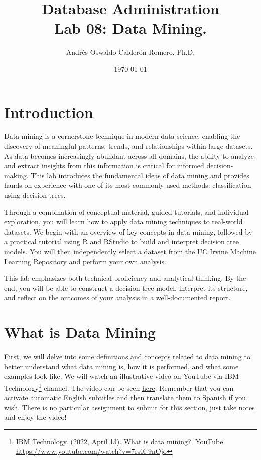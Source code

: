 \documentclass{article}
\title{Database Administration \\ Lab 08: Data Mining.}
\author{Andrés Oswaldo Calderón Romero, Ph.D.}
\date{\today}
\begin{document}
\maketitle

\section{Introduction}

Data mining is a cornerstone technique in modern data science, enabling the discovery of meaningful patterns, trends, and relationships within large datasets. As data becomes increasingly abundant across all domains, the ability to analyze and extract insights from this information is critical for informed decision-making. This lab introduces the fundamental ideas of data mining and provides hands-on experience with one of its most commonly used methods: classification using decision trees.

Through a combination of conceptual material, guided tutorials, and individual exploration, you will learn how to apply data mining techniques to real-world datasets. We begin with an overview of key concepts in data mining, followed by a practical tutorial using R and RStudio to build and interpret decision tree models. You will then independently select a dataset from the UC Irvine Machine Learning Repository and perform your own analysis.

This lab emphasizes both technical proficiency and analytical thinking. By the end, you will be able to construct a decision tree model, interpret its structure, and reflect on the outcomes of your analysis in a well-documented report.

\section{What is Data Mining}
First, we will delve into some definitions and concepts related to data mining to better understand what data mining is, how it is performed, and what some examples look like. We will watch an illustrative video on YouTube via IBM Technology\footnote{IBM Technology. (2022, April 13). What is data mining?. YouTube. \url{https://www.youtube.com/watch?v=7rs0i-9nOjo}
}
channel. The video can be seen \href{https://youtu.be/7rs0i-9nOjo?si=5cpYv6Cl16wh0Ylu}{here}. Remember that you can activate automatic English subtitles and then translate them to Spanish if you wish. There is no particular assignment to submit for this section, just take notes and enjoy the video!
\end{document}
